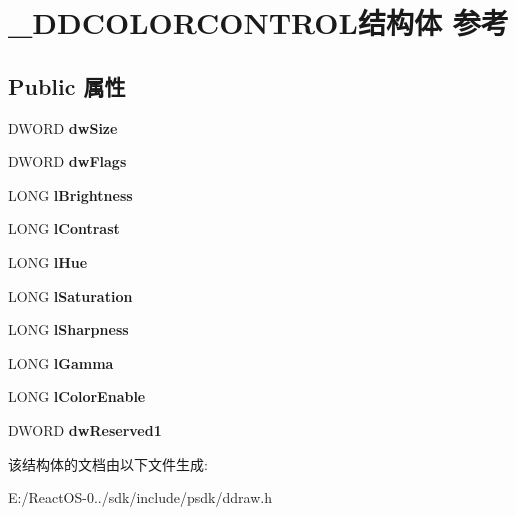 \hypertarget{struct___d_d_c_o_l_o_r_c_o_n_t_r_o_l}{}\section{\+\_\+\+D\+D\+C\+O\+L\+O\+R\+C\+O\+N\+T\+R\+O\+L结构体 参考}
\label{struct___d_d_c_o_l_o_r_c_o_n_t_r_o_l}
\subsection*{Public 属性}
\begin{DoxyCompactItemize}
\item 
\mbox{\label{struct___d_d_c_o_l_o_r_c_o_n_t_r_o_l_a4c19850951368aa29dcbac38e3b91ef3}} 
D\+W\+O\+RD {\bfseries dw\+Size}
\item 
\mbox{\label{struct___d_d_c_o_l_o_r_c_o_n_t_r_o_l_af4d3001da1efea3f1090f576e573cde7}} 
D\+W\+O\+RD {\bfseries dw\+Flags}
\item 
\mbox{\label{struct___d_d_c_o_l_o_r_c_o_n_t_r_o_l_aea1d92f26d70b7d969577832f6797888}} 
L\+O\+NG {\bfseries l\+Brightness}
\item 
\mbox{\label{struct___d_d_c_o_l_o_r_c_o_n_t_r_o_l_ac79c37194bdb4477127b3b75e0bb1a5b}} 
L\+O\+NG {\bfseries l\+Contrast}
\item 
\mbox{\label{struct___d_d_c_o_l_o_r_c_o_n_t_r_o_l_aced67fdf67fe14831e465943aa20b856}} 
L\+O\+NG {\bfseries l\+Hue}
\item 
\mbox{\label{struct___d_d_c_o_l_o_r_c_o_n_t_r_o_l_a4e934fe44ed3845816aabdb3b15ff36f}} 
L\+O\+NG {\bfseries l\+Saturation}
\item 
\mbox{\label{struct___d_d_c_o_l_o_r_c_o_n_t_r_o_l_a98bfb28a533f9d7d01fe240079b16d7b}} 
L\+O\+NG {\bfseries l\+Sharpness}
\item 
\mbox{\label{struct___d_d_c_o_l_o_r_c_o_n_t_r_o_l_aee5f25f86fbd75379e6d1befed060012}} 
L\+O\+NG {\bfseries l\+Gamma}
\item 
\mbox{\label{struct___d_d_c_o_l_o_r_c_o_n_t_r_o_l_a6eea4c1d5972f4ec1ee98434c2f23e55}} 
L\+O\+NG {\bfseries l\+Color\+Enable}
\item 
\mbox{\label{struct___d_d_c_o_l_o_r_c_o_n_t_r_o_l_a6af9e6f8f4d5ab594033561d27481a77}} 
D\+W\+O\+RD {\bfseries dw\+Reserved1}
\end{DoxyCompactItemize}


该结构体的文档由以下文件生成\+:\begin{DoxyCompactItemize}
\item 
E\+:/\+React\+O\+S-\/0../sdk/include/psdk/ddraw.\+h\end{DoxyCompactItemize}
